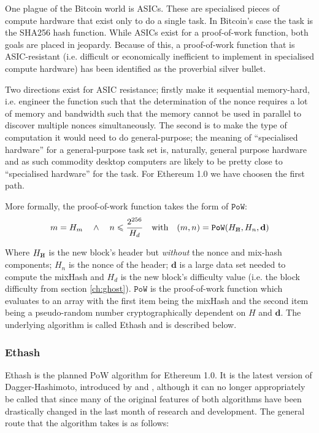 \documentclass[9pt,oneside]{amsart}
\newcommand{\hcancel}[1]{%
    \tikz[baseline=(tocancel.base)]{
        \node[inner sep=0pt,outer sep=0pt] (tocancel) {#1};
        \draw[black] (tocancel.south west) -- (tocancel.north east);
    }%
}%
\begin{document}
\begin{multicols}{2}
One plague of the Bitcoin world is ASICs. These are specialised pieces of compute hardware that exist only to do a single task. In Bitcoin's case the task is the SHA256 hash function. While ASICs exist for a proof-of-work function, both goals are placed in jeopardy. Because of this, a proof-of-work function that is ASIC-resistant (i.e. difficult or economically inefficient to implement in specialised compute hardware) has been identified as the proverbial silver bullet.

Two directions exist for ASIC resistance; firstly make it sequential memory-hard, i.e. engineer the function such that the determination of the nonce requires a lot of memory and bandwidth such that the memory cannot be used in parallel to discover multiple nonces simultaneously. The second is to make the type of computation it would need to do general-purpose; the meaning of ``specialised hardware''  for a general-purpose task set is, naturally, general purpose hardware and as such commodity desktop computers are likely to be pretty close to ``specialised hardware'' for the task. For Ethereum 1.0 we have choosen the first path.

More formally, the proof-of-work function takes the form of $\mathtt{PoW}$:
\begin{equation}
m = H_m \quad \wedge \quad n \leqslant \frac{2^{256}}{H_d} \quad \text{with} \quad (m, n) = \mathtt{PoW}(H_{\hcancel{n}}, H_n, \mathbf{d})
\end{equation}

Where $H_{\hcancel{n}}$ is the new block's header but \textit{without} the nonce and mix-hash components; $H_n$ is the nonce of the header; $\mathbf{d}$ is a large data set needed to compute the mixHash and $H_d$ is the new block's difficulty value (i.e. the block difficulty from section \ref{ch:ghost}). $\mathtt{PoW}$ is the proof-of-work function which evaluates to an array with the first item being the mixHash and the second item being a pseudo-random number cryptographically dependent on $H$ and $\mathbf{d}$. The underlying algorithm is called Ethash and is described below.
\subsubsection{Ethash}
Ethash is the planned PoW algorithm for Ethereum 1.0. It is the latest version of Dagger-Hashimoto, introduced by \cite{dagger} and \cite{hashimoto}, although it can no longer appropriately be called that since many of the original features of both algorithms have been drastically changed in the last month of research and development. The general route that the algorithm takes is as follows:


\end{multicols}
\end{document}
